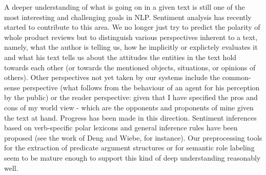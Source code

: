 A deeper understanding of what is going on in a given text is still one of the most interesting and challenging goals in NLP. Sentiment analysis has recently started to contribute to this area. We no longer just try to predict the polarity of whole product reviews but to distinguish various perspectives inherent to a text, namely, what the author is telling us, how he implicitly or explictely evaluates it and what his text tells us about the attitudes the entities in the text hold towards each other (or towards the mentioned objects, situations, or opinions of others). Other perspectives not yet taken by our systems include the common-sense perspective (what follows from the behaviour of an agent for his perception by the public) or the reader perspective: given that I have specified the pros and cons of my world view - which are the opponents and proponents of mine given the text at hand. Progress has been made in this direction. Sentiment inferences based on verb-specific polar lexicons and general inference rules have been proposed (see the work of Deng and Wiebe, for instance). Our preprocessing tools for the extraction of predicate argument structures or for semantic role labeling seem to be mature enough to support this kind of deep understanding reasonably well.
